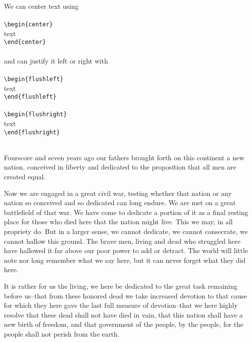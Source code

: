 We can center text using
\\
\\
\verb+\begin{center}+\\
text\\
\verb+\end{center}+
\\
\\
and can justify it left or right with
\\
\\
\verb+\begin{flushleft}+\\
text\\
\verb+\end{flushleft}+\\
\\
\verb+\begin{flushright}+\\
text\\
\verb+\end{flushright}+\\
\\
\begin{center}
Fourscore and seven years ago our fathers brought forth on this continent a new nation, conceived in liberty and dedicated to the
proposition that all men are created equal.
\end{center}

\begin{flushleft}
Now we are engaged in a great civil war, testing whether that nation or any nation so conceived and so dedicated can long endure. We are met on a great battlefield of that war. We have come to dedicate a portion of it as a final resting place for those who died here that the nation might live. This we may, in all propriety do. But in a larger sense, we cannot dedicate, we cannot consecrate, we cannot hallow this ground. The brave men, living and dead who struggled here have hallowed it far above our poor power to add or detract. The world will little note nor long remember what we say here, but it can never forget what they did here.
\end{flushleft}

\begin{flushright}
It is rather for us the living, we here be dedicated to the great task remaining before us--that from these honored dead we take
increased devotion to that cause for which they here gave the last full measure of devotion--that we here highly resolve that these dead shall not have died in vain, that this nation shall have a new birth of freedom, and that government of the people, by the people, for the people shall not perish from the earth.
\end{flushright}

